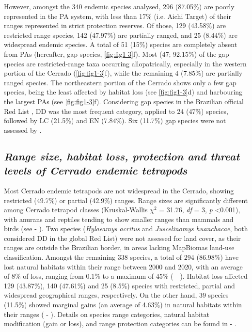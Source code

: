 \documentclass[12pt,openright,oneside,a4paper,english]{abntex2}
\begin{document}
However, amongst the 340 endemic species analysed, 296 (87.05\%) are poorly represented in the PA system, with less than 17\% (i.e. Aichi Target) of their ranges represented in strict protection reserves. Of those, 129 (43.58\%) are restricted range species, 142 (47.97\%) are partially ranged, and 25 (8.44\%) are widespread endemic species. A total of 51 (15\%) species are completely absent from PAs (hereafter, gap species, \autoref{fig:fig1-3}f). Most (47; 92.15\%) of the gap species are restricted-range taxa occurring allopatrically, especially in the western portion of the Cerrado (\autoref{fig:fig1-3}f), while the remaining 4 (7.85\%) are partially ranged species. The northeastern portion of the Cerrado shows only a few gap species, being the least affected by habitat loss (see \autoref{fig:fig1-3}d) and harbouring the largest PAs (see \autoref{fig:fig1-3}f). Considering gap species in the Brazilian official Red List \citep{ICMBio2023}, DD was the most frequent category, applied to 24 (47\%) species, followed by LC (21.5\%) and EN (7.84\%). Six (11.7\%) gap species were not assessed by \citet{ICMBio2023}.

\subsection{\textit{Range size, habitat loss, protection and threat levels of Cerrado endemic tetrapods}}

Most Cerrado endemic tetrapods are not widespread in the Cerrado, showing restricted (49.7\%) or partial (42.9\%) ranges. Range sizes are significantly different among Cerrado tetrapod classes (Kruskal-Wallis $\chi^2$ = 31.76, \textit{df} = 3, \textit{p} <0.001), with anurans and reptiles tending to show smaller ranges than mammals and birds (see  - ). Two species (\textit{Hylaeamys acritus} and \textit{Juscelinomys huanchacae}, both considered DD in the global Red List) were not assessed for land cover, as their ranges are outside the Brazilian border, in areas lacking MapBiomas land-use classification. Amongst the remaining 338 species, a total of 294 (86.98\%) have lost natural habitats within their range between 2000 and 2020, with an average of 8\% of loss, ranging from 0.1\% to a maximum of 45\% ( - ). Habitat loss affected 129 (43.87\%), 140 (47.61\%) and 25 (8.5\%) species with restricted, partial and widespread geographical ranges, respectively. On the other hand, 39 species (11.5\%) showed marginal gains (an average of 4.63\%) in natural habitats within their ranges ( - ). Details on species range categories, natural habitat modification (gain or loss), and range protection categories can be found in  - .
\end{document}
